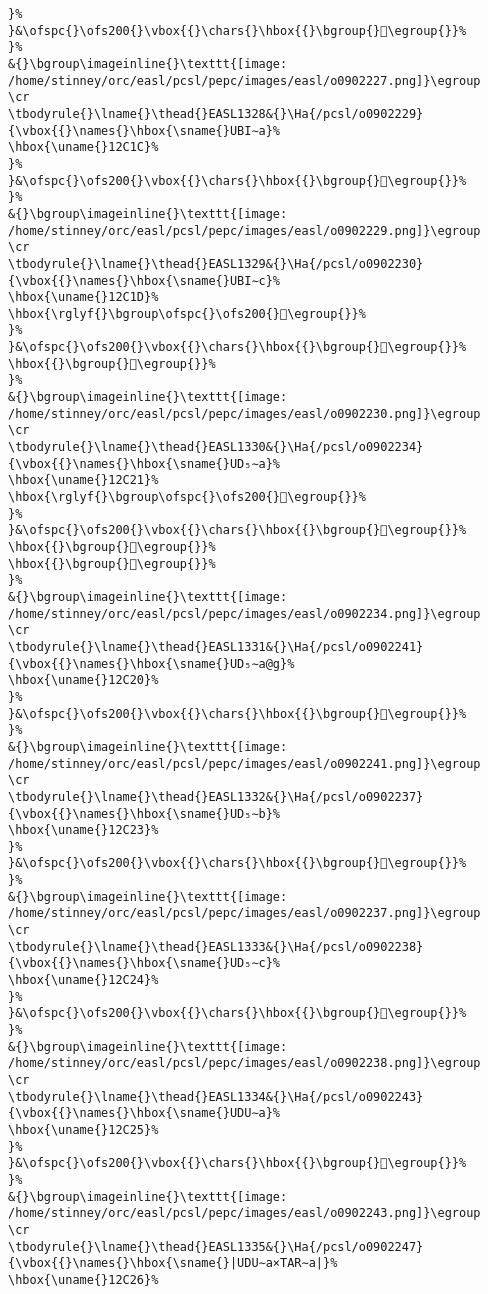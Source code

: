 \begin{verbatim}
}%
}&\ofspc{}\ofs200{}\vbox{{}\chars{}\hbox{{}\bgroup{}𒰛\egroup{}}%
}%
&{}\bgroup\imageinline{}\texttt{[image: /home/stinney/orc/easl/pcsl/pepc/images/easl/o0902227.png]}\egroup
\cr
\tbodyrule{}\lname{}\thead{}EASL1328&{}\Ha{/pcsl/o0902229}{\vbox{{}\names{}\hbox{\sname{}UBI∼a}%
\hbox{\uname{}12C1C}%
}%
}&\ofspc{}\ofs200{}\vbox{{}\chars{}\hbox{{}\bgroup{}𒰜\egroup{}}%
}%
&{}\bgroup\imageinline{}\texttt{[image: /home/stinney/orc/easl/pcsl/pepc/images/easl/o0902229.png]}\egroup
\cr
\tbodyrule{}\lname{}\thead{}EASL1329&{}\Ha{/pcsl/o0902230}{\vbox{{}\names{}\hbox{\sname{}UBI∼c}%
\hbox{\uname{}12C1D}%
\hbox{\rglyf{}\bgroup\ofspc{}\ofs200{}𒰝\egroup{}}%
}%
}&\ofspc{}\ofs200{}\vbox{{}\chars{}\hbox{{}\bgroup{}𒰝\egroup{}}%
\hbox{{}\bgroup{}𒰞\egroup{}}%
}%
&{}\bgroup\imageinline{}\texttt{[image: /home/stinney/orc/easl/pcsl/pepc/images/easl/o0902230.png]}\egroup
\cr
\tbodyrule{}\lname{}\thead{}EASL1330&{}\Ha{/pcsl/o0902234}{\vbox{{}\names{}\hbox{\sname{}UD₅∼a}%
\hbox{\uname{}12C21}%
\hbox{\rglyf{}\bgroup\ofspc{}\ofs200{}𒰡\egroup{}}%
}%
}&\ofspc{}\ofs200{}\vbox{{}\chars{}\hbox{{}\bgroup{}𒰟\egroup{}}%
\hbox{{}\bgroup{}𒰡\egroup{}}%
\hbox{{}\bgroup{}𒰢\egroup{}}%
}%
&{}\bgroup\imageinline{}\texttt{[image: /home/stinney/orc/easl/pcsl/pepc/images/easl/o0902234.png]}\egroup
\cr
\tbodyrule{}\lname{}\thead{}EASL1331&{}\Ha{/pcsl/o0902241}{\vbox{{}\names{}\hbox{\sname{}UD₅∼a@g}%
\hbox{\uname{}12C20}%
}%
}&\ofspc{}\ofs200{}\vbox{{}\chars{}\hbox{{}\bgroup{}𒰠\egroup{}}%
}%
&{}\bgroup\imageinline{}\texttt{[image: /home/stinney/orc/easl/pcsl/pepc/images/easl/o0902241.png]}\egroup
\cr
\tbodyrule{}\lname{}\thead{}EASL1332&{}\Ha{/pcsl/o0902237}{\vbox{{}\names{}\hbox{\sname{}UD₅∼b}%
\hbox{\uname{}12C23}%
}%
}&\ofspc{}\ofs200{}\vbox{{}\chars{}\hbox{{}\bgroup{}𒰣\egroup{}}%
}%
&{}\bgroup\imageinline{}\texttt{[image: /home/stinney/orc/easl/pcsl/pepc/images/easl/o0902237.png]}\egroup
\cr
\tbodyrule{}\lname{}\thead{}EASL1333&{}\Ha{/pcsl/o0902238}{\vbox{{}\names{}\hbox{\sname{}UD₅∼c}%
\hbox{\uname{}12C24}%
}%
}&\ofspc{}\ofs200{}\vbox{{}\chars{}\hbox{{}\bgroup{}𒰤\egroup{}}%
}%
&{}\bgroup\imageinline{}\texttt{[image: /home/stinney/orc/easl/pcsl/pepc/images/easl/o0902238.png]}\egroup
\cr
\tbodyrule{}\lname{}\thead{}EASL1334&{}\Ha{/pcsl/o0902243}{\vbox{{}\names{}\hbox{\sname{}UDU∼a}%
\hbox{\uname{}12C25}%
}%
}&\ofspc{}\ofs200{}\vbox{{}\chars{}\hbox{{}\bgroup{}𒰥\egroup{}}%
}%
&{}\bgroup\imageinline{}\texttt{[image: /home/stinney/orc/easl/pcsl/pepc/images/easl/o0902243.png]}\egroup
\cr
\tbodyrule{}\lname{}\thead{}EASL1335&{}\Ha{/pcsl/o0902247}{\vbox{{}\names{}\hbox{\sname{}|UDU∼a×TAR∼a|}%
\hbox{\uname{}12C26}%

\end{verbatim}
